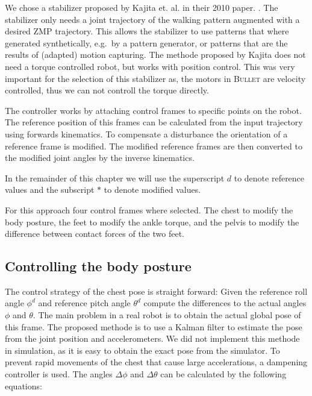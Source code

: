 \documentclass[english,ngerman]{KITreprt}
\newcommand{\clr}[2]{{\color{#1}{#2}}}
\newcommand{\todo}[1]{\marginpar{\clr{red}{#1}}}
\newcommand{\name}[1]{\textsc{#1}}
\begin{document}
We chose a stabilizer proposed by Kajita et. al. in their 2010 paper.
\todo{add reference}. The stabilizer only needs a joint trajectory of
the walking pattern augmented with a desired ZMP trajectory. This allows
the stabilizer to use patterns that where generated synthetically,
e.g.~by a pattern generator, or patterns that are the results of
(adapted) motion capturing. The methode proposed by Kajita does not need
a torque controlled robot, but works with position control. This was
very important for the selection of this stabilizer as, the motors in
\name{Bullet} are velocity controlled, thus we can not controll the
torque directly.

The controller works by attaching control frames to specific points on
the robot. The reference position of this frames can be calculated from
the input trajectory using forwards kinematics. To compensate a
disturbance the orientation of a reference frame is modified. The
modified reference frames are then converted to the modified joint
angles by the inverse kinematics.

\todo{include block digramm of controller}

In the remainder of this chapter we will use the superscript $d$ to
denote reference values and the subscript $*$ to denote modified values.

For this approach four control frames where selected. The chest to
modify the body posture, the feet to modify the ankle torque, and the
pelvis to modify the difference between contact forces of the two feet.

\subsection{Controlling the body
posture}\label{controlling-the-body-posture}

The control strategy of the chest pose is straight forward: Given the
reference roll angle $\phi^d$ and reference pitch angle $\theta^d$
compute the differences to the actual angles $\phi$ and $\theta$. The
main problem in a real robot is to obtain the actual global pose of this
frame. The proposed methode is to use a Kalman filter to estimate the
pose from the joint position and accelerometers. We did not implement
this methode in simulation, as it is easy to obtain the exact pose from
the simulator. To prevent rapid movements of the chest that cause large
accelerations, a dampening controller is used. The angles $\Delta \phi$
and $\Delta \theta$ can be calculated by the following equations:
\end{document}
